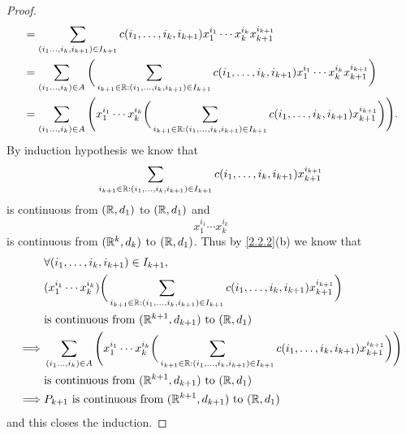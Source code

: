 \begin{proof}
\begin{align*}
     & = \sum_{(i_1 \dots, i_k, i_{k + 1}) \in I_{k + 1}} c(i_1, \dots, i_k, i_{k + 1}) x_1^{i_1} \cdots x_k^{i_k} x_{k + 1}^{i_{k + 1}}                                                                            \\
     & = \sum_{(i_1 \dots, i_k) \in A} \bigg(\sum_{i_{k + 1} \in \mathbb{R} : (i_1, \dots, i_k, i_{k + 1}) \in I_{k + 1}} c(i_1, \dots, i_k, i_{k + 1}) x_1^{i_1} \cdots x_k^{i_k} x_{k + 1}^{i_{k + 1}}\bigg)              \\
     & = \sum_{(i_1 \dots, i_k) \in A} \Bigg(x_1^{i_1} \cdots x_k^{i_k} \bigg(\sum_{i_{k + 1} \in \mathbb{R} : (i_1, \dots, i_k, i_{k + 1}) \in I_{k + 1}} c(i_1, \dots, i_k, i_{k + 1}) x_{k + 1}^{i_{k + 1}}\bigg)\Bigg).
  \end{align*}
  By induction hypothesis we know that
  \[
    \sum_{i_{k + 1} \in \mathbb{R} : (i_1, \dots, i_k, i_{k + 1}) \in I_{k + 1}} c(i_1, \dots, i_k, i_{k + 1}) x_{k + 1}^{i_{k + 1}}
  \]
  is continuous from \((\mathbb{R}, d_1)\) to \((\mathbb{R}, d_1)\) and
  \[
    x_1^{i_1} \cdots x_k^{i_k}
  \]
  is continuous from \((\mathbb{R}^k, d_k)\) to \((\mathbb{R}, d_1)\).
  Thus by \cref{2.2.2}(b) we know that
  \begin{align*}
             & \forall (i_1, \dots, i_k, i_{k + 1}) \in I_{k + 1},                                                                                                                                                       \\
             & (x_1^{i_1} \cdots x_k^{i_k}) \bigg(\sum_{i_{k + 1} \in \mathbb{R} : (i_1, \dots, i_k, i_{k + 1}) \in I_{k + 1}} c(i_1, \dots, i_k, i_{k + 1}) x_{k + 1}^{i_{k + 1}}\bigg)                                         \\
             & \text{is continuous from } (\mathbb{R}^{k + 1}, d_{k + 1}) \text{ to } (\mathbb{R}, d_1)                                                                                                                                  \\
    \implies & \sum_{(i_1 \dots, i_k) \in A} \Bigg(x_1^{i_1} \cdots x_k^{i_k} \bigg(\sum_{i_{k + 1} \in \mathbb{R} : (i_1, \dots, i_k, i_{k + 1}) \in I_{k + 1}} c(i_1, \dots, i_k, i_{k + 1}) x_{k + 1}^{i_{k + 1}}\bigg)\Bigg) \\
             & \text{is continuous from } (\mathbb{R}^{k + 1}, d_{k + 1}) \text{ to } (\mathbb{R}, d_1)                                                                                                                                  \\
    \implies & P_{k + 1} \text{ is continuous from } (\mathbb{R}^{k + 1}, d_{k + 1}) \text{ to } (\mathbb{R}, d_1)
  \end{align*}
  and this closes the induction.
\end{proof}

